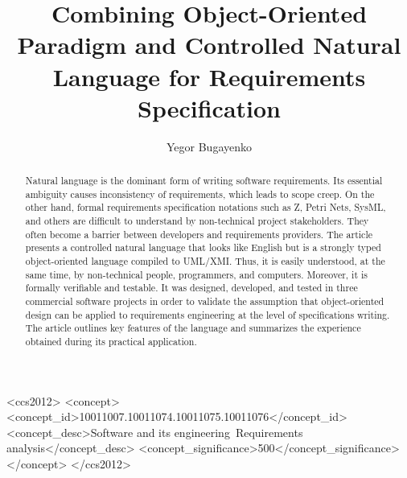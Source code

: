 \documentclass[sigplan,10pt,screen]{acmart}
\newcommand{\nospell}[1]{#1}
\begin{document}
\title{Combining Object-Oriented Paradigm and Controlled Natural Language for Requirements Specification}
\author{Yegor Bugayenko}


\begin{CCSXML}
<ccs2012>
<concept>
<concept_id>10011007.10011074.10011075.10011076</concept_id>
<concept_desc>Software and its engineering~Requirements analysis</concept_desc>
<concept_significance>500</concept_significance>
</concept>
</ccs2012>
\end{CCSXML}

\begin{abstract} Natural language is the dominant form of writing software requirements.
Its essential ambiguity causes inconsistency of requirements,
which leads to scope creep. On the other hand, formal requirements
specification notations such as Z, \nospell{Petri Nets}, SysML, and others are
difficult to understand by non-technical project stakeholders. They often
become a barrier between developers and requirements providers. The article
presents a controlled natural language that looks like English but
is a strongly typed object-oriented language compiled to
UML/XMI. Thus, it is easily understood, at the same time, by non-technical
people, programmers, and computers. Moreover, it is formally verifiable and
testable. It was designed, developed, and tested in three commercial
software projects in order to validate the assumption that object-oriented
design can be applied to requirements engineering at the level of
specifications writing. The article outlines key features of the language and summarizes
the experience obtained during its practical application. \end{abstract}
\maketitle
\end{document}
